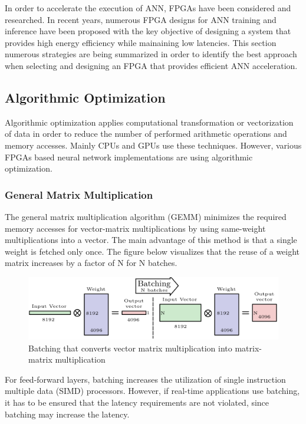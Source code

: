 In order to accelerate the execution of ANN, FPGAs have been considered and researched. In recent years, numerous FPGA designs for ANN training and inference have been proposed with the key objective of designing a system that provides high energy efficiency while mainaining low latencies. This section numerous strategies are being summarized in order to identify the best approach when selecting and designing an FPGA that provides efficient ANN acceleration.

\subsection{Algorithmic Optimization}

Algorithmic optimization applies computational transformation or vectorization of data in order to reduce the number of performed arithmetic operations and memory accesses. Mainly CPUs and GPUs use these techniques. However, various FPGAs based neural network implementations are using algorithmic optimization\cite{CnnFpgaSurvey}.

\subsubsection{General Matrix Multiplication}
The general matrix multiplication algorithm (GEMM) minimizes the required memory accesses for vector-matrix multiplications by using same-weight multiplications into a vector. The main advantage of this method is that a single weight is fetched only once. The figure below visualizes that the reuse of a weight matrix increases by a factor of N for N batches.

\begin{figure}[H]
    \centering
    \includegraphics[width=0.7\linewidth]{img/batching.png}
    \caption{Batching that converts vector matrix multiplication into matrix-matrix multiplication\cite{learningOnHardware}}
    \label{fig:batching}
\end{figure}

For feed-forward layers, batching increases the utilization of single instruction multiple data (SIMD) processors\cite{CnnAdvances}. However, if real-time applications use batching, it has to be ensured that the latency requirements are not violated, since batching may increase the latency\cite{CnnAdvances}.

